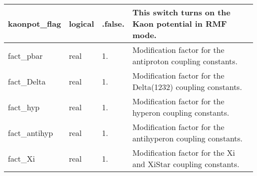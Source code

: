\documentclass{article}
\begin{document}
\begin{longtable}{llll}
\midrule
kaonpot\_flag & \begin{minipage}[t]{2cm}logical\end{minipage} & \begin{minipage}[t]{2cm}.false.\end{minipage} & \begin{minipage}[t]{12cm}This switch turns on the Kaon potential in RMF mode.\end{minipage}\\*
\midrule
fact\_pbar & \begin{minipage}[t]{2cm}real\end{minipage} & \begin{minipage}[t]{2cm}1.\end{minipage} & \begin{minipage}[t]{12cm}Modification factor for the antiproton coupling constants.\end{minipage}\\*
\midrule
fact\_Delta & \begin{minipage}[t]{2cm}real\end{minipage} & \begin{minipage}[t]{2cm}1.\end{minipage} & \begin{minipage}[t]{12cm}Modification factor for the Delta(1232) coupling constants.\end{minipage}\\*
\midrule
fact\_hyp & \begin{minipage}[t]{2cm}real\end{minipage} & \begin{minipage}[t]{2cm}1.\end{minipage} & \begin{minipage}[t]{12cm}Modification factor for the hyperon coupling constants.\end{minipage}\\*
\midrule
fact\_antihyp & \begin{minipage}[t]{2cm}real\end{minipage} & \begin{minipage}[t]{2cm}1.\end{minipage} & \begin{minipage}[t]{12cm}Modification factor for the antihyperon coupling constants.\end{minipage}\\*
\midrule
fact\_Xi & \begin{minipage}[t]{2cm}real\end{minipage} & \begin{minipage}[t]{2cm}1.\end{minipage} & \begin{minipage}[t]{12cm}Modification factor for the Xi and XiStar coupling constants.\end{minipage}\\*

\end{longtable}
\end{document}
